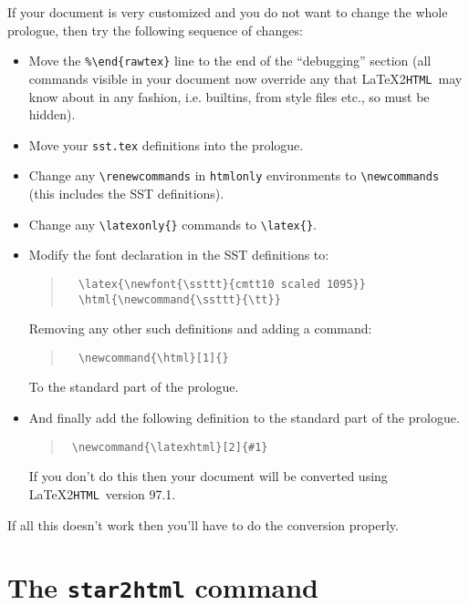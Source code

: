\documentclass[twoside,11pt]{article}
\newcommand{\latex}[1]{#1}
\newcommand{\html}[1]{}
\newcommand{\latexhtml}[2]{#1}
\newcommand{\xlabel}[1]{}
\newcommand{\latextohtml}{\LaTeX2\texttt{HTML}}
\renewcommand{\_}{\texttt{\symbol{95}}}
\begin{document}
If your document is very customized and you do not want to change the
whole prologue, then try the following sequence of changes:
\begin{itemize}
\item Move the \verb#%#\verb#\end{rawtex}# line to the end of the
      ``debugging'' section (all commands visible in your document now
      override any that \latextohtml\ may know about in any fashion,
      i.e. builtins, from style files etc., so must be hidden).
\item Move your \verb#sst.tex# definitions into the prologue.
\item Change any \verb#\renewcommands# in \verb#htmlonly# environments
      to \verb#\newcommands# (this includes the SST definitions).
\item Change any \verb#\latexonly{}# commands to \verb#\latex{}#.
\item Modify the font declaration in the SST definitions to:
\begin{quote}
\begin{verbatim}
  \latex{\newfont{\ssttt}{cmtt10 scaled 1095}}
  \html{\newcommand{\ssttt}{\tt}}
\end{verbatim}
\end{quote}
Removing any other such definitions and adding a command:
\begin{quote}
\begin{verbatim}
  \newcommand{\html}[1]{}
\end{verbatim}
\end{quote}
To the standard part of the prologue.
\item And finally add the following definition to the standard part of 
      the prologue.
\begin{quote}
\begin{verbatim}
 \newcommand{\latexhtml}[2]{#1}
\end{verbatim}
\end{quote}
If you don't do this then your document will be converted using
\latextohtml\ version 97.1.
\end{itemize}
If all this doesn't work then you'll have to do the conversion properly.

\newpage
\section{\xlabel{the_star2html_command}The \texttt{star2html} command\label{star2html}}
\end{document}
